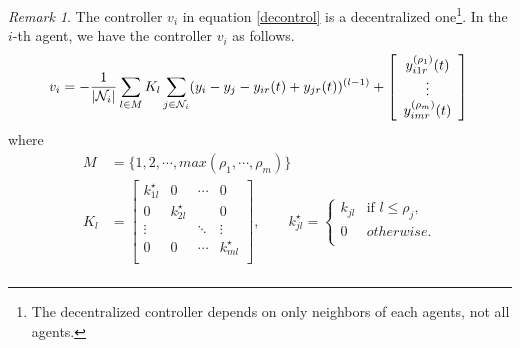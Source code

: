 \documentclass[11pt, a4paper, oneside, openany, reqno]{book}
\theoremstyle{definition}
\theoremstyle{remark}
\newtheorem{remark}[theorem]{Remark}
\numberwithin{equation}{chapter} %
\newcommand{\NBR}{\mathcal{N}}
\begin{document}
\begin{remark}
	The controller $ v_i $ in equation \eqref{decontrol} is a decentralized one\footnote
	{The decentralized controller depends on only neighbors of each agents, not all agents.}. 
	In the $ i $-th agent, we have the controller $ v_i $ as follows.
	\begin{equation}
		v_i = -\frac{1}{\vert \NBR_i \vert} \sum_{l \in M}
				K_{l}  \sum_{j \in \NBR_i } (y_i - y_j - y_{ir}(t) + y_{jr}(t)) ^{(l-1)}  
				+ \left[  \begin{array}{c } y_{i1r}^{(\rho_1)}(t) \\
				\vdots \\	y_{imr}^{(\rho_m)}(t) \end{array}	   \right] \\
	\end{equation} 	
	where
	\begin{equation}\begin{split}
		M &= \lbrace 1,2,\cdots, max(\rho_1,\cdots,\rho_m) \rbrace \\
		K_l &= \left[  \begin{array}{cccc } 
		k_{1l}^\star & 0 & \cdots & 0 \\
		0 & k_{2l}^\star & & 0 \\
		\vdots & & \ddots & \vdots \\
		0 & 0 & \cdots & k_{ml}^\star \\
		\end{array} \right] ,
		\qquad 
		k_{jl}^\star = \begin{cases} k_{jl} & \text{if } l \leq \rho_j, \\	0 & otherwise. \\
		\end{cases}	\\
	\end{split}\end{equation}
	

\end{remark}
\end{document}
